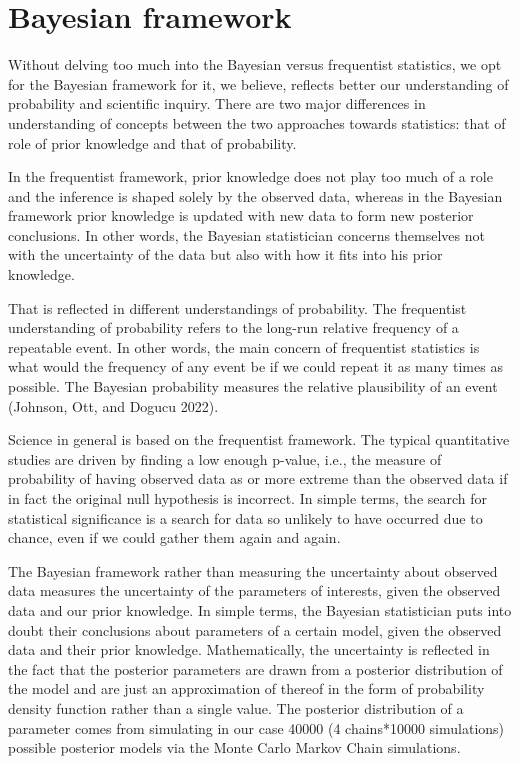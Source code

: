 \documentclass[
  11pt,
]{article}
\begin{document}
\hypertarget{bayesian-framework}{%
\section{Bayesian framework}\label{bayesian-framework}}

Without delving too much into the Bayesian versus frequentist
statistics, we opt for the Bayesian framework for it, we believe,
reflects better our understanding of probability and scientific inquiry.
There are two major differences in understanding of concepts between the
two approaches towards statistics: that of role of prior knowledge and
that of probability.

In the frequentist framework, prior knowledge does not play too much of
a role and the inference is shaped solely by the observed data, whereas
in the Bayesian framework prior knowledge is updated with new data to
form new posterior conclusions. In other words, the Bayesian
statistician concerns themselves not with the uncertainty of the data
but also with how it fits into his prior knowledge.

That is reflected in different understandings of probability. The
frequentist understanding of probability refers to the long-run relative
frequency of a repeatable event. In other words, the main concern of
frequentist statistics is what would the frequency of any event be if we
could repeat it as many times as possible. The Bayesian probability
measures the relative plausibility of an event (Johnson, Ott, and Dogucu
2022).

Science in general is based on the frequentist framework. The typical
quantitative studies are driven by finding a low enough p-value, i.e.,
the measure of probability of having observed data as or more extreme
than the observed data if in fact the original null hypothesis is
incorrect. In simple terms, the search for statistical significance is a
search for data so unlikely to have occurred due to chance, even if we
could gather them again and again.

The Bayesian framework rather than measuring the uncertainty about
observed data measures the uncertainty of the parameters of interests,
given the observed data and our prior knowledge. In simple terms, the
Bayesian statistician puts into doubt their conclusions about parameters
of a certain model, given the observed data and their prior knowledge.
Mathematically, the uncertainty is reflected in the fact that the
posterior parameters are drawn from a posterior distribution of the
model and are just an approximation of thereof in the form of
probability density function rather than a single value. The posterior
distribution of a parameter comes from simulating in our case 40000 (4
chains*10000 simulations) possible posterior models via the Monte Carlo
Markov Chain simulations.
\end{document}
